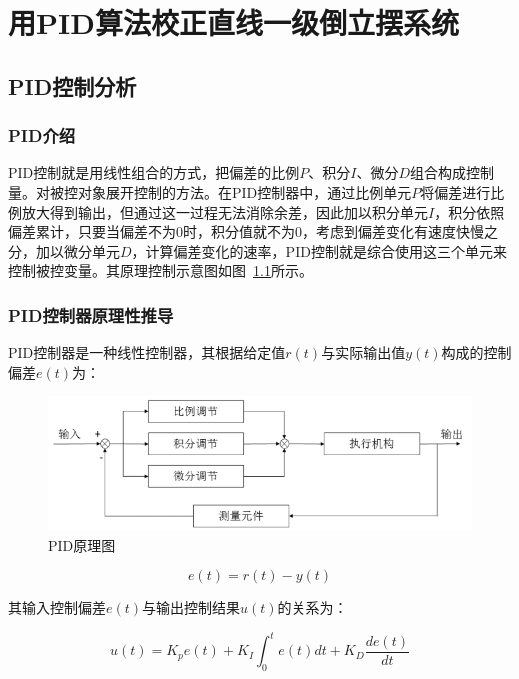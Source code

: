 \chapter{用PID算法校正直线一级倒立摆系统}
\section{PID控制分析}

\subsection{PID介绍}

PID控制就是用线性组合的方式，把偏差的比例$P$、积分$I$、微分$D$组合构成控制量。对被控对象展开控制的方法。在PID控制器中，通过比例单元$P$将偏差进行比例放大得到输出，但通过这一过程无法消除余差，因此加以积分单元$I$，积分依照偏差累计，只要当偏差不为0时，积分值就不为0，考虑到偏差变化有速度快慢之分，加以微分单元$D$，计算偏差变化的速率，PID控制就是综合使用这三个单元来控制被控变量。其原理控制示意图如图~\ref{fig:PID_principle}所示。

\subsection{PID控制器原理性推导}
	
PID控制器是一种线性控制器，其根据给定值$r(t)$与实际输出值$y(t)$构成的控制偏差$e(t)$为：

\begin{figure}[hbpt]
\centering
\includegraphics[width=12cm]{PID_principle.png}
\caption{PID原理图}\label{fig:PID_principle}
\end{figure}

\begin{equation}
e(t)=r(t)-y(t)
\end{equation}

其输入控制偏差$e(t)$与输出控制结果$u(t)$的关系为：

\begin{equation}
u(t)=K_pe(t)+K_I\int_0^te(t)dt+K_D \frac{de(t)}{dt}
\end{equation}

